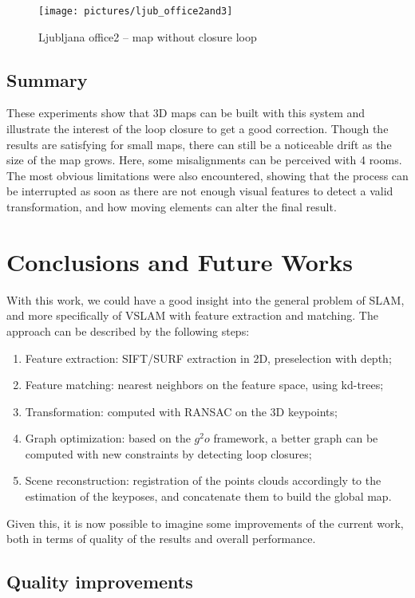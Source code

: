 \begin{figure}[H]
\centering
\texttt{[image: pictures/ljub\_office2and3]}
\caption{Ljubljana office2 -- map without closure loop}
\end{figure}

\section{Summary}
These experiments show that 3D maps can be built with this system and illustrate the interest of the loop closure to get a good correction. Though the results are satisfying for small maps, there can still be a noticeable drift as the size of the map grows. Here, some misalignments can be perceived with 4 rooms. The most obvious limitations were also encountered, showing that the process can be interrupted as soon as there are not enough visual features to detect a valid transformation, and how moving elements can alter the final result.

\chapter{Conclusions and Future Works}
\label{chap:conclusion}

With this work, we could have a good insight into the general problem of \gls{SLAM}, and more specifically of \gls{VSLAM} with feature extraction and matching. The approach can be described by the following steps:
\begin{enumerate}
\item Feature extraction: \gls{SIFT}/\gls{SURF} extraction in 2D, preselection with depth;
\item Feature matching: nearest neighbors on the feature space, using kd-trees;
\item Transformation: computed with \gls{RANSAC} on the 3D keypoints;
\item Graph optimization: based on the $g^2o$ framework, a better graph can be computed with new constraints by detecting loop closures;
\item Scene reconstruction: registration of the points clouds accordingly to the estimation of the keyposes, and concatenate them to build the global map.
\end{enumerate}

Given this, it is now possible to imagine some improvements of the current work, both in terms of quality of the results and overall performance.

\section{Quality improvements}

